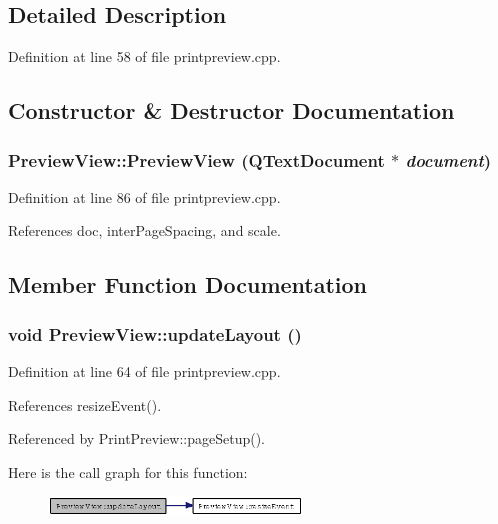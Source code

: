 \subsection{Detailed Description}




Definition at line 58 of file printpreview.cpp.

\subsection{Constructor \& Destructor Documentation}
\subsubsection{\setlength{\rightskip}{0pt plus 5cm}Preview\-View::Preview\-View (QText\-Document $\ast$ {\em document})}\label{classPreviewView_efe9605a6dcc9978f375fb64e17c8427}




Definition at line 86 of file printpreview.cpp.

References doc, inter\-Page\-Spacing, and scale.

\subsection{Member Function Documentation}
\subsubsection{\setlength{\rightskip}{0pt plus 5cm}void Preview\-View::update\-Layout ()\hspace{0.3cm}{\tt  [inline]}}\label{classPreviewView_cdfe534bae625626c7fbe6ab86770048}




Definition at line 64 of file printpreview.cpp.

References resize\-Event().

Referenced by Print\-Preview::page\-Setup().

Here is the call graph for this function:\begin{figure}[H]
\begin{center}
\leavevmode
\includegraphics[width=191pt]{classPreviewView_cdfe534bae625626c7fbe6ab86770048_cgraph}
\end{center}
\end{figure}
